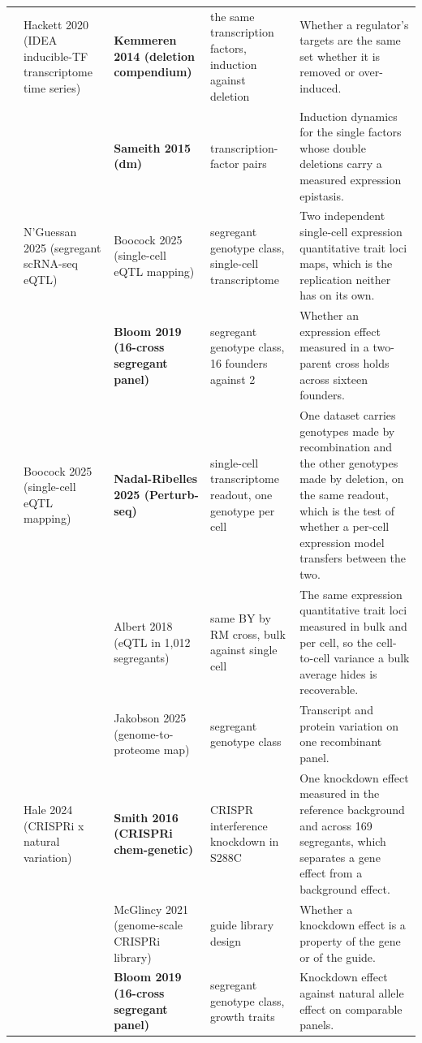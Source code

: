 \begin{landscape}
\begin{longtable}{@{}r@{\hspace{4pt}} L{42mm} L{44mm} L{48mm} L{96mm}@{}}
 & Hackett 2020 (IDEA inducible-TF transcriptome time series) & \textbf{Kemmeren 2014 (deletion compendium)} & the same transcription factors, induction against deletion & Whether a regulator's targets are the same set whether it is removed or over-induced. \\
 &  & \textbf{Sameith 2015 (dm)} & transcription-factor pairs & Induction dynamics for the single factors whose double deletions carry a measured expression epistasis. \\
 & N'Guessan 2025 (segregant scRNA-seq eQTL) & Boocock 2025 (single-cell eQTL mapping) & segregant genotype class, single-cell transcriptome & Two independent single-cell expression quantitative trait loci maps, which is the replication neither has on its own. \\
 &  & \textbf{Bloom 2019 (16-cross segregant panel)} & segregant genotype class, 16 founders against 2 & Whether an expression effect measured in a two-parent cross holds across sixteen founders. \\
 & Boocock 2025 (single-cell eQTL mapping) & \textbf{Nadal-Ribelles 2025 (Perturb-seq)} & single-cell transcriptome readout, one genotype per cell & One dataset carries genotypes made by recombination and the other genotypes made by deletion, on the same readout, which is the test of whether a per-cell expression model transfers between the two. \\
 &  & Albert 2018 (eQTL in 1,012 segregants) & same BY by RM cross, bulk against single cell & The same expression quantitative trait loci measured in bulk and per cell, so the cell-to-cell variance a bulk average hides is recoverable. \\
 &  & Jakobson 2025 (genome-to-proteome map) & segregant genotype class & Transcript and protein variation on one recombinant panel. \\
 & Hale 2024 (CRISPRi x natural variation) & \textbf{Smith 2016 (CRISPRi chem-genetic)} & CRISPR interference knockdown in S288C & One knockdown effect measured in the reference background and across 169 segregants, which separates a gene effect from a background effect. \\
 &  & McGlincy 2021 (genome-scale CRISPRi library) & guide library design & Whether a knockdown effect is a property of the gene or of the guide. \\
 &  & \textbf{Bloom 2019 (16-cross segregant panel)} & segregant genotype class, growth traits & Knockdown effect against natural allele effect on comparable panels. \\

\end{longtable}
\end{landscape}
